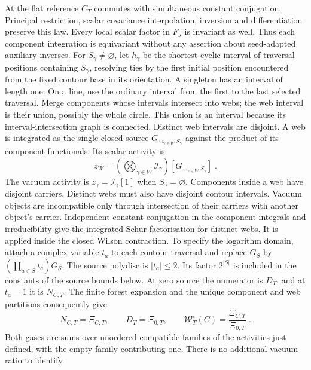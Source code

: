 \documentclass[11pt]{article}
\begin{document}
At the flat reference $C_T$ commutes with simultaneous constant conjugation. Principal restriction, scalar covariance interpolation, inversion and differentiation preserve this law. Every local scalar factor in $F_J$ is invariant as well. Thus each component integration is equivariant without any assertion about seed-adapted auxiliary inverses. For $S_\gamma\ne \varnothing$, let $h_\gamma$ be the shortest cyclic interval of traversal positions containing $S_\gamma$, resolving ties by the first initial position encountered from the fixed contour base in its orientation. A singleton has an interval of length one. On a line, use the ordinary interval from the first to the last selected traversal. Merge components whose intervals intersect into webs; the web interval is their union, possibly the whole circle. This union is an interval because its interval-intersection graph is connected. Distinct web intervals are disjoint. A web is integrated as the single closed source $G_{\cup_{\gamma\in W}S_\gamma}$ against the product of its component functionals. Its scalar activity is
\begin{equation}\label{eq:marginal-web-activity}
    z_W=\left(\bigotimes_{\gamma\in W}\mathcal I_\gamma\right)
        \left[G_{\cup_{\gamma\in W}S_\gamma}\right]\;.
\end{equation}
The vacuum activity is $z_\gamma=\mathcal I_\gamma[1]$ when $S_\gamma=\varnothing$. Components inside a web have disjoint carriers. Distinct webs must also have disjoint contour intervals. Vacuum objects are incompatible only through intersection of their carriers with another object's carrier. Independent constant conjugation in the component integrals and irreducibility give the integrated Schur factorisation for distinct webs. It is applied inside the closed Wilson contraction. To specify the logarithm domain, attach a complex variable $t_a$ to each contour traversal and replace $G_S$ by $(\prod_{a\in S}t_a)G_S$. The source polydisc is $|t_a|\leq 2$. Its factor $2^{|S|}$ is included in the constants of the source bounds below. At zero source the numerator is $D_T$, and at $t_a=1$ it is $N_{C,T}$. The finite forest expansion and the unique component and web partitions consequently give
\begin{equation}\label{eq:marginal-exact-gases}
    N_{C,T}=\Xi_{C,T},\qquad D_T=\Xi_{0,T},\qquad
    \mathcal W_T^\circ(C)=\frac{\Xi_{C,T}}{\Xi_{0,T}}\;.
\end{equation}
Both gases are sums over unordered compatible families of the activities just defined, with the empty family contributing one. There is no additional vacuum ratio to identify.
\end{document}
